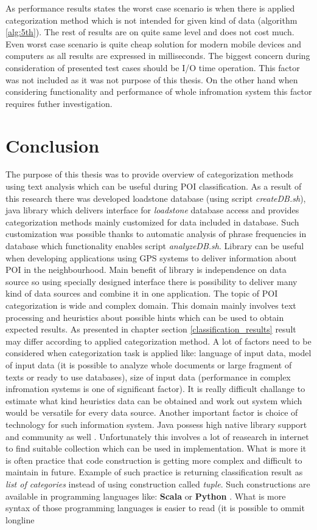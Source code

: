 As performance results states the worst case scenario is when there is applied categorization method which is not intended for given kind of data (algorithm \ref{alg:5th}). The rest of results are on quite same level and does not cost much. Even worst case scenario is quite cheap solution for modern mobile devices and computers as all results are expressed in milliseconds. The biggest concern during consideration of presented test cases should be I/O time operation. This factor was not included as it was not purpose of this thesis. On the other hand when considering functionality and performance of whole infromation system this factor requires futher investigation.    
\section{Conclusion}
The purpose of this thesis was to provide overview of categorization methods using text analysis which can be useful during POI classification. As a result of this research there was developed loadstone database (using script \textit{createDB.sh}), java library which delivers interface for \textit{loadstone} database access and provides categorization methods mainly customized for data included in database. Such customization was possible thanks to automatic analysis of phrase frequencies in database which functionality enables script \textit{analyzeDB.sh}. Library can be useful when developing applications using GPS systems to deliver information about POI in the neighbourhood. Main benefit of library is independence on data source so using specially designed interface there is possibility to deliver many kind of data sources and combine it in one application. The topic of POI categorization is wide and complex domain. This domain mainly involves text processing and heuristics about possible hints which can be used to obtain expected results. As presented in chapter section \ref{classification_results} result may differ according to applied categorization method. A lot of factors need to be considered when categorization task is applied like: language of input data, model of input data (it is possible to analyze whole documents or large fragment of texts or ready to use databases), size of input data (performance in complex infromation systems is one of significant factor). It is really difficult challange to estimate what kind heuristics data can be obtained and work out system which would be versatile for every data source. Another important factor is choice of technology for such information system. Java possess high native library support and community as well \cite{24} \cite{25}. Unfortunately this involves a lot of reasearch in internet to find suitable collection which can be used in implementation. What is more it is often practice that code construction is getting more complex and difficult to maintain in future. Example of such practice is returning classification result as \textit{list of categories} instead of using construction called \textit{tuple}. Such constructions are available in programming languages like: \textbf{Scala} \cite{26} or \textbf{Python} \cite{27}. What is more syntax of those programming languages is easier to read (it is possible to ommit longline 